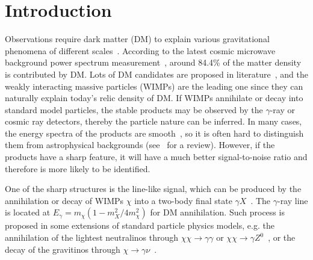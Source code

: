 \documentclass[
	twocolumn,
]{aastex6} %
\newcommand{\gr}{$\gamma$-ray\xspace}
\begin{document}
\section{Introduction}\label{sec:introduction}
Observations require dark matter (DM) to explain various gravitational phenomena of different scales~\citep{Bertone2005,Bertone2018}.
According to the latest cosmic microwave background power spectrum measurement~\citep{Aghanim2018}, around 84.4\% of the matter density is contributed by DM.
Lots of DM candidates are proposed in literature~\citep{Feng2010}, and the weakly interacting massive particles (WIMPs) are the leading one since they can naturally explain today's relic density of DM.
If WIMPs annihilate or decay into standard model particles, the stable products may be observed by the \gr or cosmic ray detectors, thereby the particle nature can be inferred.
In many cases, the energy spectra of the products are smooth~\citep{Cirelli2011}, so it is often hard to distinguish them from astrophysical backgrounds (see~\citep{Charles2016} for a review).
However, if the products have a sharp feature, it will have a much better signal-to-noise ratio and therefore is more likely to be identified.

One of the sharp structures is the line-like signal, which can be produced by the annihilation or decay of WIMPs $\chi$ into a two-body final state $\gamma X$~\citep{Bergstrom1988}.
The \gr line is located at $E_\gamma=m_\chi (1-m_X^2/4m_\chi^2)$ for DM annihilation.
Such process is proposed in some extensions of standard particle physics models, e.g. the annihilation of the lightest neutralinos through $\chi\chi \to \gamma\gamma$ or $\chi\chi \to \gamma Z^0$~\citep{Rudaz1991}, or the decay of the gravitinos through $\chi \to \gamma \nu$~\citep{Ibarra2008}.
\end{document}
